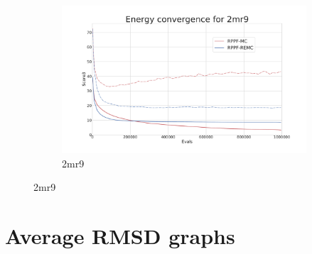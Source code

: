 \begin{figure}[ht]\ContinuedFloat
  \begin{subfigure}{0.7\linewidth}
    \centering
    \includegraphics[width=1\linewidth]{Figuras/plots/energy_convergence/energy_convergence_2mr9.pdf}
    \caption{2mr9}
  \end{subfigure}
\end{figure}

\section{Average RMSD graphs}

